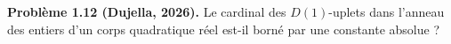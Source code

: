 \textbf{Problème 1.12 (Dujella, 2026).} Le cardinal des $D(1)$-uplets dans l'anneau des entiers d'un corps quadratique réel est-il borné par une constante absolue ?
